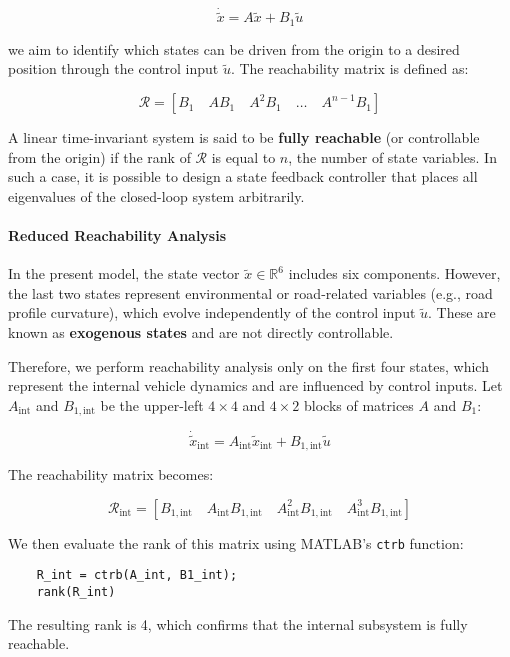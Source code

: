\documentclass[]{report}
\begin{document}
\[
\dot{\tilde{x}} = A \tilde{x} + B_1 \tilde{u}
\]

we aim to identify which states can be driven from the origin to a desired position through the control input $\tilde{u}$. The reachability matrix is defined as:

\[
\mathcal{R} = \left[ B_1 \quad AB_1 \quad A^2B_1 \quad \dots \quad A^{n-1}B_1 \right]
\]

A linear time-invariant system is said to be \textbf{fully reachable} (or controllable from the origin) if the rank of $\mathcal{R}$ is equal to $n$, the number of state variables. In such a case, it is possible to design a state feedback controller that places all eigenvalues of the closed-loop system arbitrarily.

\paragraph{Reduced Reachability Analysis}

In the present model, the state vector $\tilde{x} \in \mathbb{R}^6$ includes six components. However, the last two states represent environmental or road-related variables (e.g., road profile curvature), which evolve independently of the control input $\tilde{u}$. These are known as \textbf{exogenous states} and are not directly controllable.

Therefore, we perform reachability analysis only on the first four states, which represent the internal vehicle dynamics and are influenced by control inputs. Let $A_{\text{int}}$ and $B_{1, \text{int}}$ be the upper-left $4 \times 4$ and $4 \times 2$ blocks of matrices $A$ and $B_1$:

\[
\dot{\tilde{x}}_{\text{int}} = A_{\text{int}} \tilde{x}_{\text{int}} + B_{1,\text{int}} \tilde{u}
\]

The reachability matrix becomes:

\[
\mathcal{R}_{\text{int}} = \left[ B_{1,\text{int}} \quad A_{\text{int}}B_{1,\text{int}} \quad A_{\text{int}}^2B_{1,\text{int}} \quad A_{\text{int}}^3B_{1,\text{int}} \right]
\]

We then evaluate the rank of this matrix using MATLAB's \texttt{ctrb} function:

\begin{verbatim}
	R_int = ctrb(A_int, B1_int);
	rank(R_int)
\end{verbatim}

The resulting rank is 4, which confirms that the internal subsystem is fully reachable.
\end{document}
